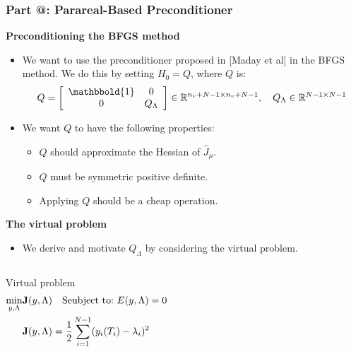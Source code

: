 \documentclass[9pt]{beamer}
\makeatletter
\newcommand*{\rom}[1]{\expandafter\@slowromancap\romannumeral #1@}
\makeatother
\begin{document}
\begin{frame}
\frametitle{\textbf{ Part \rom{4}:} Parareal-Based Preconditioner}
\textbf{Preconditioning the BFGS method}
\begin{itemize}
\item{We want to use the preconditioner proposed in [Maday et al] in the BFGS method. We do this by setting $H_0=Q$, where $Q$ is: {\small
\begin{align*}
Q = \left[ \begin{array}{cc}
	\mathbbold{1} & 0 \\
	0 & Q_{\Lambda} \\
	\end{array} \right]\in \mathbb{R}^{n_v+N-1\times n_v+N-1},\quad Q_{\Lambda}\in\mathbb{R}^{N-1\times N-1}
\end{align*}}}
\item<1->{We want $Q$ to have the following properties:\begin{itemize}
\item<1->[1.]{$Q$ should approximate the Hessian of $\hat J_{\mu}$.}
\item<1->[2.]{$Q$ must be symmetric positive definite.}
\item<1->[3.]{Applying $Q$ should be a cheap operation.}
\end{itemize}
}
\end{itemize}
\textbf{The virtual problem}
\begin{itemize}
\item{We derive and motivate $Q_{\Lambda}$ by considering the virtual problem.}
\end{itemize}
\begin{columns}
\begin{block}{Virtual problem}
{\small\begin{align*}
\min_{y,\Lambda}&\bold J(y,\Lambda)\quad \textrm{Seubject to:}\ E(y,\Lambda)=0 \\
&\bold J(y,\Lambda)=\frac{1}{2}\sum_{i=1}^{N-1}(y_i(T_i)-\lambda_i)^2
\end{align*}}
\end{block}
\end{columns}
\end{frame}
\end{document}
